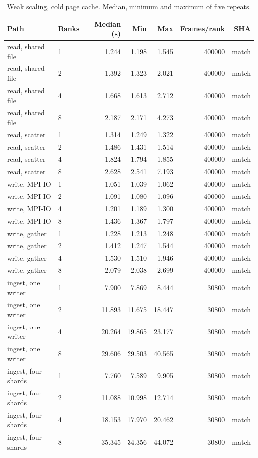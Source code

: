 \begin{table}[ht]
\centering
\scriptsize
\caption{Weak scaling, cold page cache. Median, minimum and maximum of five repeats.}
\label{tab:mpi-weak-cold}
\begin{tabular}{llrrrrr}
\toprule
Path & Ranks & Median (s) & Min & Max & Frames/rank & SHA \\
\midrule
read, shared file & 1 & 1.244 & 1.198 & 1.545 & 400000 & match \\
read, shared file & 2 & 1.392 & 1.323 & 2.021 & 400000 & match \\
read, shared file & 4 & 1.668 & 1.613 & 2.712 & 400000 & match \\
read, shared file & 8 & 2.187 & 2.171 & 4.273 & 400000 & match \\
read, scatter & 1 & 1.314 & 1.249 & 1.322 & 400000 & match \\
read, scatter & 2 & 1.486 & 1.431 & 1.514 & 400000 & match \\
read, scatter & 4 & 1.824 & 1.794 & 1.855 & 400000 & match \\
read, scatter & 8 & 2.628 & 2.541 & 7.193 & 400000 & match \\
write, MPI-IO & 1 & 1.051 & 1.039 & 1.062 & 400000 & match \\
write, MPI-IO & 2 & 1.091 & 1.080 & 1.096 & 400000 & match \\
write, MPI-IO & 4 & 1.201 & 1.189 & 1.300 & 400000 & match \\
write, MPI-IO & 8 & 1.436 & 1.367 & 1.797 & 400000 & match \\
write, gather & 1 & 1.228 & 1.213 & 1.248 & 400000 & match \\
write, gather & 2 & 1.412 & 1.247 & 1.544 & 400000 & match \\
write, gather & 4 & 1.530 & 1.510 & 1.946 & 400000 & match \\
write, gather & 8 & 2.079 & 2.038 & 2.699 & 400000 & match \\
ingest, one writer & 1 & 7.900 & 7.869 & 8.444 & 30800 & match \\
ingest, one writer & 2 & 11.893 & 11.675 & 18.447 & 30800 & match \\
ingest, one writer & 4 & 20.264 & 19.865 & 23.177 & 30800 & match \\
ingest, one writer & 8 & 29.606 & 29.503 & 40.565 & 30800 & match \\
ingest, four shards & 1 & 7.760 & 7.589 & 9.905 & 30800 & match \\
ingest, four shards & 2 & 11.088 & 10.998 & 12.714 & 30800 & match \\
ingest, four shards & 4 & 18.153 & 17.970 & 20.462 & 30800 & match \\
ingest, four shards & 8 & 35.345 & 34.356 & 44.072 & 30800 & match \\
\bottomrule
\end{tabular}
\end{table}
